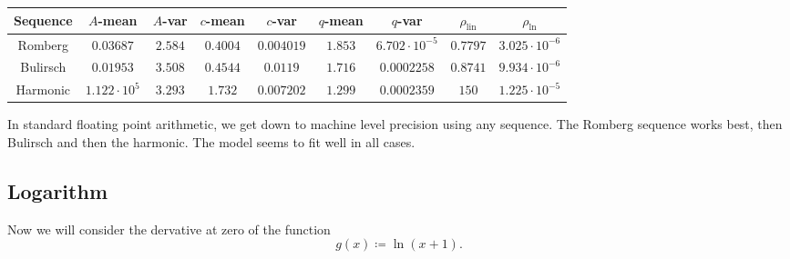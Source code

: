 \begin{table}[H]
    \centering
    \small
    \begin{tabular}{c||c|c|c|c|c|c|c|c}
Sequence & \(A\)-mean & \(A\)-var & \(c\)-mean & \(c\)-var & \(q\)-mean & \(q\)-var & \(\rho_{\operatorname{lin}}\) & \(\rho_{\ln}\)\\\hline
\rowcolor{green}
Romberg & \(0.03687\) & \(2.584\) & \(0.4004\) & \(0.004019\) & \(1.853\) & \(6.702\cdot 10^{-5}\) & \(0.7797\) & \(3.025\cdot 10^{-6}\) \\
\rowcolor{green}
Bulirsch & \(0.01953\) & \(3.508\) & \(0.4544\) & \(0.0119\) & \(1.716\) & \(0.0002258\) & \(0.8741\) & \(9.934\cdot 10^{-6}\) \\
\rowcolor{green}
Harmonic & \(1.122\cdot 10^5\) & \(3.293\) & \(1.732\) & \(0.007202\) & \(1.299\) & \(0.0002359\) & \(150\) & \(1.225\cdot 10^{-5}\) \\
    \end{tabular}
    \label{tab:my_label}
\end{table}

In standard floating point arithmetic, we get down to machine level precision using any sequence. The Romberg sequence works best, then Bulirsch and then the harmonic. The model seems to fit well in all cases.

\subsection{Logarithm}

Now we will consider the dervative at zero of the function 
\[
g(x) \coloneqq \ln(x+1).
\]

